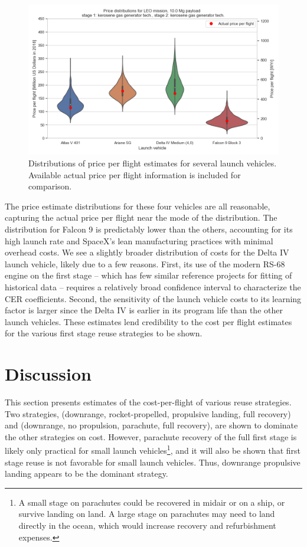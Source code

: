 \documentclass[conf]{new-aiaa}
\begin{document}
\begin{multicols}{2}
\begin{figure}
    \centering
    \includegraphics[width=\textwidth]{../../lvreuse/analysis/cost/plots/vehicle_ppf_validation}
    \caption{\label{fig:vehicle_ppf_validation} Distributions of price per flight estimates for several launch vehicles. Available actual price per flight information is included for comparison.}
\end{figure}

The price estimate distributions for these four vehicles are all reasonable, capturing the actual price per flight near the mode of the distribution. The distribution for Falcon 9 is predictably lower than the others, accounting for its high launch rate and SpaceX's lean manufacturing practices with minimal overhead costs. We see a slightly broader distribution of costs for the Delta IV launch vehicle, likely due to a few reasons. First, its use of the modern RS-68 engine on the first stage -- which has few similar reference projects for fitting of historical data -- requires a relatively broad confidence interval to characterize the CER coefficients. Second, the sensitivity of the launch vehicle costs to its learning factor is larger since the Delta IV is earlier in its program life than the other launch vehicles. These estimates lend credibility to the cost per flight estimates for the various first stage reuse strategies to be shown. 

\section{Discussion}

This section presents estimates of the cost-per-flight of various reuse strategies. Two strategies, (downrange, rocket-propelled, propulsive landing, full recovery) and (downrange, no propulsion, parachute, full recovery), are shown to dominate the other strategies on cost. However, parachute recovery of the full first stage is likely only practical for small launch vehicles\footnote{A small stage on parachutes could be recovered in midair or on a ship, or survive landing on land. A large stage on parachutes may need to land directly in the ocean, which would increase recovery and refurbishment expenses.}, and it will also be shown that first stage reuse is not favorable for small launch vehicles. Thus, downrange propulsive landing appears to be the dominant strategy.


\end{multicols}
\end{document}
